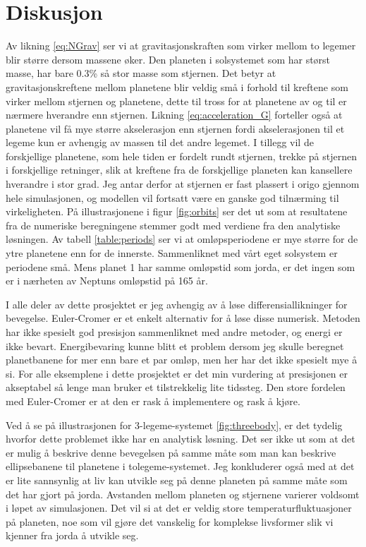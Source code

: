 \documentclass[reprint,english,notitlepage]{revtex4-1}  %
\begin{document}
\section{Diskusjon}

Av likning \ref{eq:NGrav} ser vi at gravitasjonskraften som virker mellom to legemer blir større dersom massene øker. Den planeten i solsystemet som har størst masse, har bare 0.3\% så stor masse som stjernen. Det betyr at gravitasjonskreftene mellom planetene blir veldig små i forhold til kreftene som virker mellom stjernen og planetene, dette til tross for at planetene av og til er nærmere hverandre enn stjernen. Likning \ref{eq:acceleration_G} forteller også at planetene vil få mye større akselerasjon enn stjernen fordi akselerasjonen til et legeme kun er avhengig av massen til det andre legemet. I tillegg vil de forskjellige planetene, som hele tiden er fordelt rundt stjernen, trekke på stjernen i forskjellige retninger, slik at kreftene fra de forskjellige planeten kan kansellere hverandre i stor grad. Jeg antar derfor at stjernen er fast plassert i origo gjennom hele simulasjonen, og modellen vil fortsatt være en ganske god tilnærming til virkeligheten. På illustrasjonene i figur \ref{fig:orbits} ser det ut som at resultatene fra de numeriske beregningene stemmer godt med verdiene fra den analytiske løsningen. Av tabell \ref{table:periods} ser vi at omløpsperiodene er mye større for de ytre planetene enn for de innerste. Sammenliknet med vårt eget solsystem er periodene små. Mens planet 1 har samme omløpstid som jorda, er det ingen som er i nærheten av Neptuns omløpstid på 165 år.

I alle deler av dette prosjektet er jeg avhengig av å løse differensiallikninger for bevegelse. Euler-Cromer er et enkelt alternativ for å løse disse numerisk. Metoden har ikke spesielt god presisjon sammenliknet med andre metoder, og energi er ikke bevart. Energibevaring kunne blitt et problem dersom jeg skulle beregnet planetbanene for mer enn bare et par omløp, men her har det ikke spesielt mye å si. For alle eksemplene i dette prosjektet er det min vurdering at presisjonen er akseptabel så lenge man bruker et tilstrekkelig lite tidssteg. Den store fordelen med Euler-Cromer er at den er rask å implementere og rask å kjøre.

Ved å se på illustrasjonen for 3-legeme-systemet \ref{fig:threebody}, er det tydelig hvorfor dette problemet ikke har en analytisk løsning. Det ser ikke ut som at det er mulig å beskrive denne bevegelsen på samme måte som man kan beskrive ellipsebanene til planetene i tolegeme-systemet. Jeg konkluderer også med at det er lite sannsynlig at liv kan utvikle seg på denne planeten på samme måte som det har gjort på jorda. Avstanden mellom planeten og stjernene varierer voldsomt i løpet av simulasjonen. Det vil si at det er veldig store temperaturfluktuasjoner på planeten, noe som vil gjøre det vanskelig for komplekse livsformer slik vi kjenner fra jorda å utvikle seg.
\end{document}
